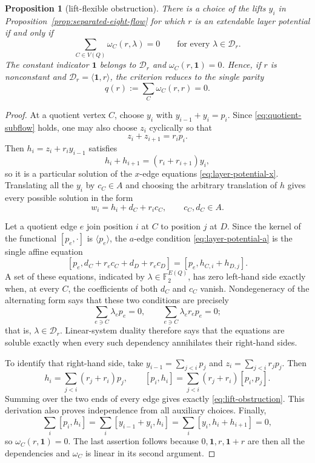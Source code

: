 \documentclass[11pt,a4paper]{article}
\newtheorem{proposition}[theorem]{Proposition}
\theoremstyle{definition}
\theoremstyle{remark}
\begin{document}
\begin{proposition}[lift-flexible obstruction]\label{prop:lift-obstruction}
There is a choice of the lifts $y_i$ in Proposition~\ref{prop:separated-eight-flow} for which $r$ is an extendable layer potential if and only if
\begin{equation}\label{eq:lift-obstruction}
 \sum_{C\in V(Q)}\omega_C(r,\lambda)=0
 \qquad\text{for every }\lambda\in\mathcal D_r.
\end{equation}
The constant indicator $\boldsymbol1$ belongs to $\mathcal D_r$ and $\omega_C(r,\boldsymbol1)=0$.  Hence, if $r$ is nonconstant and $\mathcal D_r=\langle\boldsymbol1,r\rangle$, the criterion reduces to the single parity
\[
 q(r):=\sum_C\omega_C(r,r)=0.
\]
\end{proposition}
\begin{proof}
At a quotient vertex $C$, choose $y_i$ with $y_{i-1}+y_i=p_i$.  Since \eqref{eq:quotient-subflow} holds, one may also choose $z_i$ cyclically so that
\[
 z_i+z_{i+1}=r_i p_i.
\]
Then $h_i=z_i+r_i y_{i-1}$ satisfies
\[
 h_i+h_{i+1}=(r_i+r_{i+1})y_i,
\]
so it is a particular solution of the $x$-edge equations \eqref{eq:layer-potential-x}.  Translating all the $y_i$ by $c_C\in A$ and choosing the arbitrary translation of $h$ gives every possible solution in the form
\[
 w_i=h_i+d_C+r_i c_C,
 \qquad c_C,d_C\in A.
\]

Let a quotient edge $e$ join position $i$ at $C$ to position $j$ at $D$.  Since the kernel of the functional $[p_e,\mathord\cdot]$ is $\langle p_e\rangle$, the $a$-edge condition \eqref{eq:layer-potential-a} is the single affine equation
\[
 [p_e,d_C+r_ec_C+d_D+r_ec_D]
   =[p_e,h_{C,i}+h_{D,j}].
\]
A set of these equations, indicated by $\lambda\in\mathbb F_2^{E(Q)}$, has zero left-hand side exactly when, at every $C$, the coefficients of both $d_C$ and $c_C$ vanish.  Nondegeneracy of the alternating form says that these two conditions are precisely
\[
 \sum_{e\ni C}\lambda_ep_e=0,
 \qquad
 \sum_{e\ni C}\lambda_er_ep_e=0;
\]
that is, $\lambda\in\mathcal D_r$.  Linear-system duality therefore says that the equations are soluble exactly when every such dependency annihilates their right-hand sides.

To identify that right-hand side, take $y_{i-1}=\sum_{j<i}p_j$ and $z_i=\sum_{j<i}r_jp_j$.  Then
\[
 h_i=\sum_{j<i}(r_j+r_i)p_j,
 \qquad
 [p_i,h_i]=\sum_{j<i}(r_j+r_i)[p_i,p_j].
\]
Summing over the two ends of every edge gives exactly \eqref{eq:lift-obstruction}.  This derivation also proves independence from all auxiliary choices.  Finally,
\[
 \sum_i[p_i,h_i]
 =\sum_i[y_{i-1}+y_i,h_i]
 =\sum_i[y_i,h_i+h_{i+1}]=0,
\]
so $\omega_C(r,\boldsymbol1)=0$.  The last assertion follows because $0,\boldsymbol1,r,\boldsymbol1+r$ are then all the dependencies and $\omega_C$ is linear in its second argument.
\end{proof}
\end{document}
